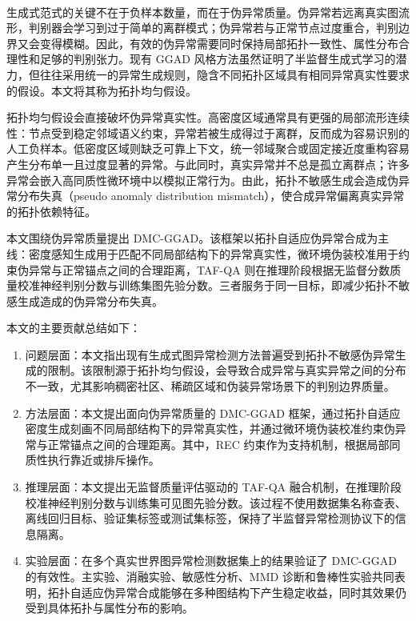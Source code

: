 ﻿﻿﻿﻿    \documentclass[conference, onecolumn]{IEEEtran}
\begin{document}
    生成式范式的关键不在于负样本数量，而在于伪异常质量。伪异常若远离真实图流形，判别器会学习到过于简单的离群模式；伪异常若与正常节点过度重合，判别边界又会变得模糊。因此，有效的伪异常需要同时保持局部拓扑一致性、属性分布合理性和足够的判别张力。现有 GGAD 风格方法虽然证明了半监督生成式学习的潜力，但往往采用统一的异常生成规则，隐含不同拓扑区域具有相同异常真实性要求的假设。本文将其称为拓扑均匀假设。

    拓扑均匀假设会直接破坏伪异常真实性。高密度区域通常具有更强的局部流形连续性：节点受到稳定邻域语义约束，异常若被生成得过于离群，反而成为容易识别的人工负样本。低密度区域则缺乏可靠上下文，统一邻域聚合或固定接近度重构容易产生分布单一且过度显著的异常。与此同时，真实异常并不总是孤立离群点；许多异常会嵌入高同质性微环境中以模拟正常行为。由此，拓扑不敏感生成会造成伪异常分布失真（pseudo anomaly distribution mismatch），使合成异常偏离真实异常的拓扑依赖特征。

    本文围绕伪异常质量提出 DMC-GGAD。该框架以拓扑自适应伪异常合成为主线：密度感知生成用于匹配不同局部结构下的异常真实性，微环境伪装校准用于约束伪异常与正常锚点之间的合理距离，TAF-QA 则在推理阶段根据无监督分数质量校准神经判别分数与训练集图先验分数。三者服务于同一目标，即减少拓扑不敏感生成造成的伪异常分布失真。

    本文的主要贡献总结如下：
    \begin{enumerate}
        \item 问题层面：本文指出现有生成式图异常检测方法普遍受到拓扑不敏感伪异常生成的限制。该限制源于拓扑均匀假设，会导致合成异常与真实异常之间的分布不一致，尤其影响稠密社区、稀疏区域和伪装异常场景下的判别边界质量。
        \item 方法层面：本文提出面向伪异常质量的 DMC-GGAD 框架，通过拓扑自适应密度生成刻画不同局部结构下的异常真实性，并通过微环境伪装校准约束伪异常与正常锚点之间的合理距离。其中，REC 约束作为支持机制，根据局部同质性执行靠近或排斥操作。
        \item 推理层面：本文提出无监督质量评估驱动的 TAF-QA 融合机制，在推理阶段校准神经判别分数与训练集可见图先验分数。该过程不使用数据集名称查表、离线回归目标、验证集标签或测试集标签，保持了半监督异常检测协议下的信息隔离。
        \item 实验层面：在多个真实世界图异常检测数据集上的结果验证了 DMC-GGAD 的有效性。主实验、消融实验、敏感性分析、MMD 诊断和鲁棒性实验共同表明，拓扑自适应伪异常合成能够在多种图结构下产生稳定收益，同时其效果仍受到具体拓扑与属性分布的影响。
    \end{enumerate}

\end{document}
